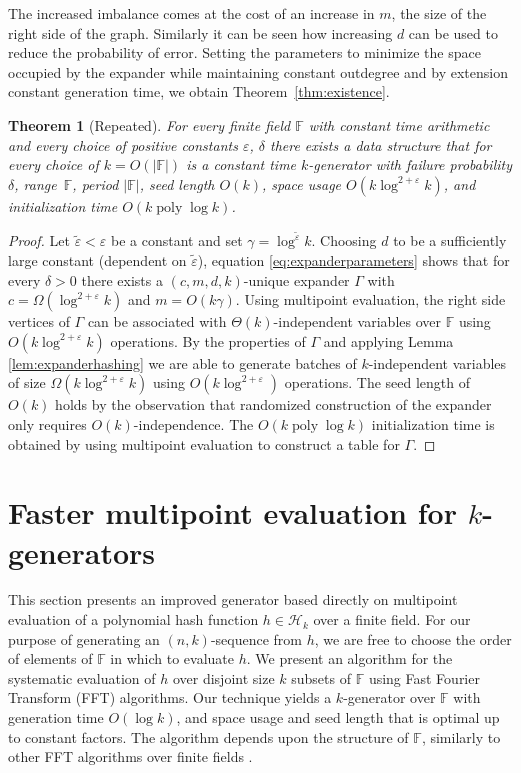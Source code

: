 \documentclass[a4paper,11pt]{article}
\theoremstyle{plain}
\newtheorem{restate}{Theorem}
\theoremstyle{definition}
\newcommand{\F}{\mathbb{F}}
\DeclareMathOperator{\poly}{poly}
\begin{document}
The increased imbalance comes at the cost of an increase in $m$, the size of the right side of the graph. 
Similarly it can be seen how increasing $d$ can be used to reduce the probability of error.
Setting the parameters to minimize the space occupied by the expander while maintaining constant outdegree and by extension constant generation time, we obtain Theorem~\ref{thm:existence}.  
\begin{restate}[Repeated]
For every finite field $\F$ with constant time arithmetic and every choice of positive constants $\varepsilon$, $\delta$ there exists a data structure 
that for every choice of $k = O(|\F|)$ is a constant time $k$-generator with failure probability $\delta$,
range~$\F$, period $|\F|$, seed length $O(k)$, space usage $O(k \log^{2+\varepsilon}k)$, and initialization time $O(k \poly \log k)$.
\end{restate}
\begin{proof}
Let $\tilde{\varepsilon} < \varepsilon$ be a constant and set $\gamma = \log^{\tilde{\varepsilon}}k$.
Choosing $d$ to be a sufficiently large constant (dependent on $\tilde{\varepsilon}$), equation \eqref{eq:expanderparameters} shows that 
for every $\delta > 0$ there exists a $(c, m, d, k)$-unique expander $\Gamma$ with $c = \Omega(\log^{2+\varepsilon}k)$ and $m = O(k\gamma)$.
Using multipoint evaluation, the right side vertices of $\Gamma$ can be associated with $\Theta(k)$-independent variables over $\F$ using $O(k \log^{2 + \varepsilon}k)$ operations.
By the properties of $\Gamma$ and applying Lemma \ref{lem:expanderhashing} we are able to generate batches of $k$-independent variables of size $\Omega(k\log^{2+\varepsilon}k)$ using $O(k \log^{2+\varepsilon})$ operations.
The seed length of $O(k)$ holds by the observation that randomized construction of the expander only requires $O(k)$-independence.
The $O(k \poly \log k)$ initialization time is obtained by using multipoint evaluation to construct a table for $\Gamma$.
\end{proof}
\section{Faster multipoint evaluation for $k$-generators} \label{sec:faster}
This section presents an improved generator based directly on multipoint evaluation of a polynomial hash function $h \in \mathcal{H}_{k}$ over a finite field.
For our purpose of generating an $(n,k)$-sequence from $h$, we are free to choose the order of elements of $\F$ in which to evaluate $h$.  
We present an algorithm for the systematic evaluation of $h$ over disjoint size $k$ subsets of $\F$ using Fast Fourier Transform (FFT) algorithms.
Our technique yields a $k$-generator over $\F$ with generation time $O(\log k)$, and space usage and seed length that is optimal up to constant factors.
The algorithm depends upon the structure of $\F$, similarly to other FFT algorithms over finite fields \cite{bhattacharya2004}. 
\end{document}

